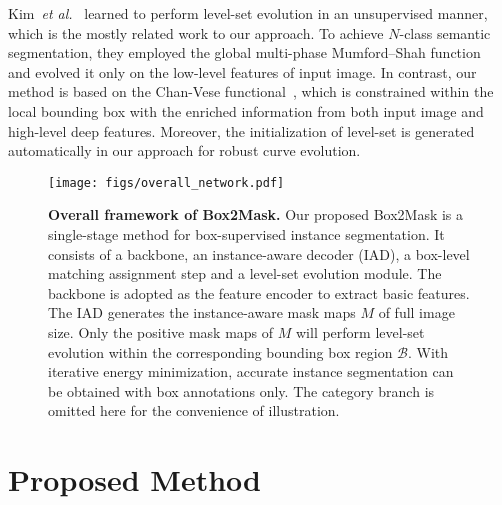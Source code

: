 \documentclass[12pt,onecolumn,letterpaper]{article}
\begin{document}
Kim~\textit{et al.}~\cite{tip2019mumford} learned to perform level-set evolution in an unsupervised manner, which is the mostly related work to our approach. To achieve $N$-class semantic segmentation, they employed the global multi-phase Mumford–Shah function~\cite{mumford1989optimal} and evolved it only on the low-level features of input image. In contrast, our method is based on the Chan-Vese functional~\cite{tip2001_active_contour}, which is constrained within the local bounding box with the enriched information from both input image and high-level deep features. Moreover, the initialization of level-set is generated automatically in our approach for robust curve evolution.


\begin{figure*}[t]
	\centering
	\texttt{[image: figs/overall\_network.pdf]}
	\caption{\textbf{Overall framework of Box2Mask.} 
		Our proposed Box2Mask is a single-stage method for box-supervised instance segmentation. It consists of a backbone, an instance-aware decoder (IAD), a box-level matching assignment step and a level-set evolution module. The backbone is adopted as the feature encoder to extract basic features.
		The IAD generates the instance-aware mask maps $M$ of full image size.   
		Only the positive mask maps of $M$ will perform level-set evolution within the corresponding bounding box region $\mathcal{B}$. 
		With iterative energy minimization, accurate instance segmentation can be obtained with box annotations only. The category branch is omitted here for the convenience of illustration.}
	\label{fig:overallnetwork}
\end{figure*}

\section{Proposed Method}
\end{document}
